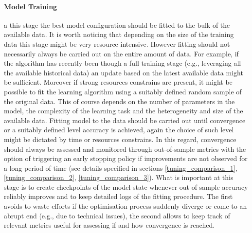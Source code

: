 \paragraph*{Model Training} a this stage the best model configuration should be fitted to the bulk of the available data. It is worth noticing that depending on the size of the training data this stage might be very resource intensive. However fitting should not necessarily always be carried out on the entire amount of data. For example, if the algorithm has recently been though a full training stage (e.g., leveraging all the available historical data) an update based on the latest available data might be sufficient. Moreover if strong resources constrains are present, it might be possible to fit the learning algorithm using a suitably defined random sample of the original data. This of course depends on the number of parameters in the model, the complexity of the learning task and the heterogeneity and size of the available data. Fitting model to the data should be carried out until convergence or a suitably defined level accuracy is achieved, again the choice of such level might be dictated by time or resources constrains. In this regard, convergence should always be assessed and monitored through out-of-sample metrics with the option of triggering an early stopping policy if improvements are not observed for a long period of time (see details specified in sections \ref{tuning_comparison_1}, \ref{tuning_comparison_2}, \ref{tuning_comparison_3}). What is important at this stage is to create checkpoints of the model state whenever out-of-sample accuracy reliably improves and to keep detailed logs of the fitting procedure. The first avoids to waste efforts if the optimisation process suddenly diverge or come to an abrupt end (e.g., due to technical issues), the second allows to keep track of relevant metrics useful for assessing if and how convergence is reached.

